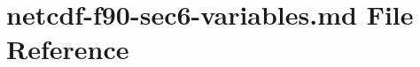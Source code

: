 \hypertarget{netcdf-f90-sec6-variables_8md}{}\section{netcdf-\/f90-\/sec6-\/variables.md File Reference}
\label{netcdf-f90-sec6-variables_8md}
